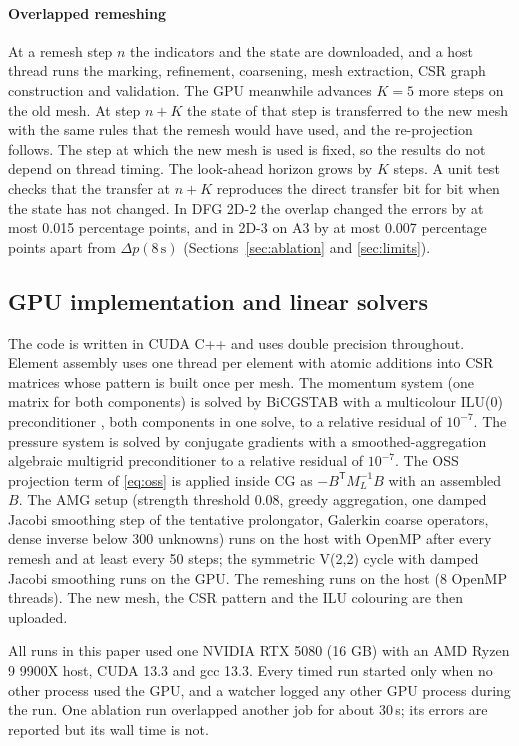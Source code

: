 \documentclass[preprint,12pt,number]{elsarticle}
\begin{document}
\paragraph{Overlapped remeshing}
At a remesh step $n$ the indicators and the state are downloaded, and a host thread runs the
marking, refinement, coarsening, mesh extraction, CSR graph construction and validation. The
GPU meanwhile advances $K = 5$ more steps on the old mesh. At step $n + K$ the state of that
step is transferred to the new mesh with the same rules that the remesh would have used, and
the re-projection follows. The step at which the new mesh is used is fixed, so the results do
not depend on thread timing. The look-ahead horizon grows by $K$ steps. A unit test checks that
the transfer at $n + K$ reproduces the direct transfer bit for bit when the state has not
changed. In DFG 2D-2 the overlap changed the errors by at most 0.015 percentage points, and
in 2D-3 on A3 by at most 0.007 percentage points apart from $\Delta p(8\,\mathrm{s})$
(Sections~\ref{sec:ablation} and \ref{sec:limits}).

\subsection{GPU implementation and linear solvers}
\label{sec:gpu}

The code is written in CUDA C++ and uses double precision throughout. Element assembly uses
one thread per element with atomic additions into CSR matrices whose pattern is built once per
mesh. The momentum system (one matrix for both components) is solved by BiCGSTAB
\citep{vandervorst1992} with a multicolour ILU(0) preconditioner \citep{saad2003}, both
components in one solve, to a relative residual of $10^{-7}$. The pressure system is solved by
conjugate gradients with a smoothed-aggregation algebraic multigrid preconditioner
\citep{vanek1996} to a relative residual of $10^{-7}$. The OSS projection term of
\eqref{eq:oss} is applied inside CG as $-B^{\mathsf T}M_L^{-1}B$ with an assembled $B$. The AMG
setup (strength threshold 0.08, greedy aggregation, one damped Jacobi smoothing step of the
tentative prolongator, Galerkin coarse operators, dense inverse below 300 unknowns) runs on the
host with OpenMP after every remesh and at least every 50 steps; the symmetric V(2,2) cycle
with damped Jacobi smoothing runs on the GPU. The remeshing runs on the host (8 OpenMP threads).
The new mesh, the CSR pattern and the ILU colouring are then uploaded.

All runs in this paper used one NVIDIA RTX 5080 (16 GB) with an AMD Ryzen 9 9900X host,
CUDA 13.3 and gcc 13.3. Every timed run started only when no other process used the GPU, and
a watcher logged any other GPU process during the run. One ablation run overlapped another job
for about 30\,s; its errors are reported but its wall time is not.
\end{document}
